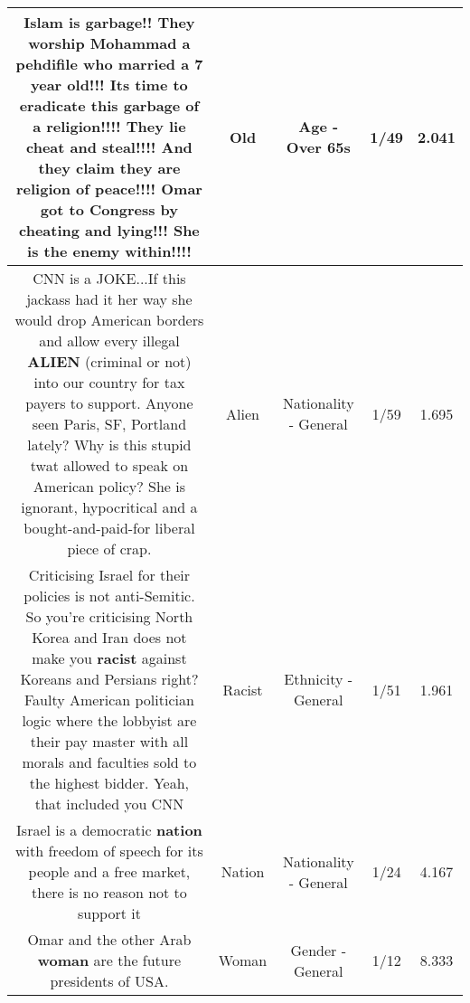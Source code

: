 \documentclass[11pt]{article}
\newlength\mylength
\begin{document}
\begin{center}
\begin{longtable}{|C{.65\mylength}|C{.30\mylength}|C{.12\mylength}|C{.12\mylength}|C{.12\mylength}|}
  \small Islam is garbage!! They worship Mohammad a pehdifile who married a 7 year \textbf{old}!!! Its time to eradicate this garbage of a religion!!!! They lie cheat and steal!!!! And they claim they are religion of peace!!!! Omar got to Congress by cheating and lying!!! She is the enemy within!!!!\normalsize   & Old & Age - Over 65s & 1/49 & 2.041 \\  \hline
  \small CNN is a JOKE...If this jackass had it her way she would drop American borders and allow every illegal \textbf{ALIEN} (criminal or not) into our country for tax payers to support. Anyone seen Paris, SF, Portland lately? Why is this stupid twat allowed to speak on American policy? She is ignorant, hypocritical and a bought-and-paid-for liberal piece of crap.\normalsize   & Alien & Nationality - General & 1/59 & 1.695 \\  \hline
  \small Criticising Israel for their policies is not anti-Semitic. So you're criticising North Korea and Iran does not make you \textbf{racist} against Koreans and Persians right? Faulty American politician logic where the lobbyist are their pay master with all morals and faculties sold to the highest bidder. Yeah, that included you CNN\normalsize   & Racist & Ethnicity - General & 1/51 & 1.961 \\  \hline
  \small Israel is a democratic \textbf{nation} with freedom of speech for its people and a free market, there is no reason not to support it\normalsize   & Nation & Nationality - General & 1/24 & 4.167 \\  \hline
  \small Omar and the other Arab \textbf{woman} are the future presidents of USA.\normalsize   & Woman & Gender - General & 1/12 & 8.333 \\  \hline

\end{longtable}
\end{center}
\end{document}

